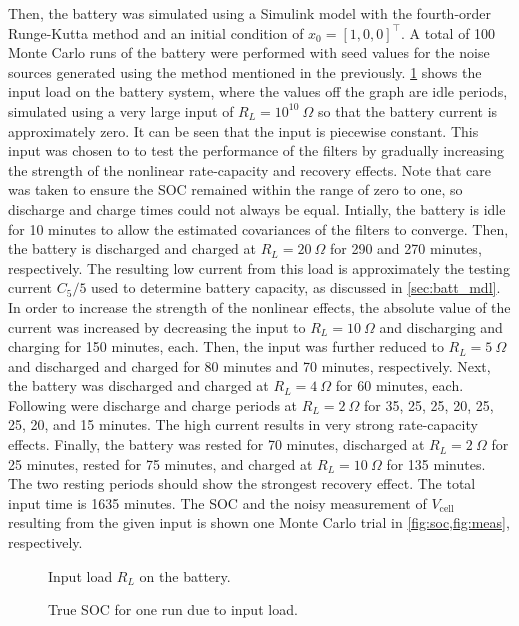 \documentclass[../zhang_thesis.tex]{subfiles}
\begin{document}
Then, the battery was simulated using a Simulink model with the fourth-order Runge-Kutta method and an initial condition of $x_0=[1,0,0]^\top$. A total of 100 Monte Carlo runs of the battery were performed with seed values for the noise sources generated using the method mentioned in the previously. \cref{fig:input} shows the input load on the battery system, where the values off the graph are idle periods, simulated using a very large input of $R_L=10^{10}~\Omega$ so that the battery
current is approximately zero. It can be seen that the input is piecewise constant. This input was chosen to to test the performance of the filters by gradually increasing the strength of the nonlinear rate-capacity and recovery effects. Note that care was taken to ensure the SOC remained within the range of zero to one, so discharge and charge times could not always be equal. Intially, the battery is idle for 10 minutes to allow the estimated covariances of the filters to converge. Then, the
battery is discharged and charged at $R_L=20~\Omega$ for 290 and 270 minutes, respectively. The resulting low current from this load is approximately the testing current $C_5/5$ used to determine battery capacity, as discussed in \cref{sec:batt_mdl}. In order to increase the strength of the nonlinear effects, the absolute value of the current was increased by decreasing the input to $R_L=10~\Omega$ and discharging and charging for 150 minutes, each. Then, the input was further reduced to
$R_L=5~\Omega$ and discharged and charged for 80 minutes and 70 minutes, respectively. Next, the battery was discharged and charged at $R_L=4~\Omega$ for 60 minutes, each. Following were discharge and charge periods at $R_L=2~\Omega$ for 35, 25, 25, 20, 25, 25, 20, and 15 minutes. The high current results in very strong rate-capacity effects. Finally, the battery was rested for 70 minutes, discharged at $R_L=2~\Omega$ for 25 minutes, rested for 75 minutes, and charged at $R_L=10~\Omega$
for 135 minutes. The two resting periods should show the strongest recovery effect. The total input time is 1635 minutes. The SOC and the noisy measurement of $V_\text{cell}$ resulting from the given input is shown one Monte Carlo trial in \cref{fig:soc,fig:meas}, respectively.

\begin{figure}[htb]
\centering

\caption{Input load $R_L$ on the battery.}
\label{fig:input}
\end{figure}

\begin{figure}[htb]
\centering

\caption{True SOC for one run due to input load.}
\label{fig:soc}
\end{figure}
\end{document}
